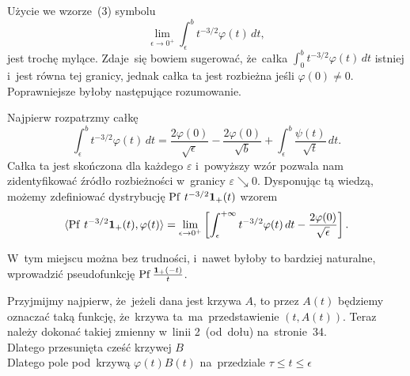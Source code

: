 \documentclass[a4paper,11pt]{article}
\begin{document}
\start {} Użycie we wzorze~(3) symbolu
\begin{equation}
  \label{eq:Zem-s01-01}
  \lim_{ \epsilon \to 0^{ + } } \int_{ \epsilon }^{ b } t^{ -3 / 2 } \varphi( t ) \, dt,
\end{equation}
jest trochę mylące. Zdaje~się bowiem sugerować, że~całka
$\int_{ 0 }^{ b } t^{ -3 / 2 } \varphi( t ) \, dt$ istniej i~jest równa tej
granicy, jednak całka ta jest rozbieżna jeśli $\varphi( 0 ) \neq 0$.
Poprawniejsze byłoby następujące rozumowanie.

Najpierw rozpatrzmy całkę
\begin{equation}
  \label{eq:Zem-s01-02}
  \int_{ \epsilon }^{ b } t^{ -3/2 } \varphi( t ) \, dt
  =
  \frac{ 2 \varphi( 0 ) }{ \sqrt{ \epsilon } } - \frac{ 2 \varphi( 0 ) }{ \sqrt{ b } }
  + \int_{ \epsilon }^{ b } \frac{ \psi( t ) }{ \sqrt{ t } } \, dt.
\end{equation}
Całka ta jest skończona dla każdego $\varepsilon$ i~powyższy wzór pozwala
nam zidentyfikować źródło rozbieżności w~granicy $\varepsilon \searrow 0$.
Dysponując tą wiedzą, możemy zdefiniować dystrybucję
$\mathrm{Pf}\, \, t^{ -3 / 2 } \mathbf{1}_{ + }( t )$ wzorem
\begin{equation}
  \label{eq:Zem-s01-03}
  \langle \mathrm{Pf}\, \, t^{ -3/2 } \mathbf{1}_{ + }( t ), \varphi( t ) \rangle
  =
  \lim_{ \epsilon \to 0^{ + } } \left[ \int_{ \epsilon }^{ +\infty } t^{ -3/2 } \varphi( t ) \, dt
    - \frac{ 2 \varphi( 0 ) }{ \sqrt{ \epsilon } } \right].
\end{equation}

\vspace{\spaceFour}



\start {} W~tym miejscu można bez trudności, i~nawet byłoby to
bardziej naturalne, wprowadzić pseudofunkcję
$\mathrm{Pf}\, \frac{ \mathbf{1}_{ + }( -t )}{ t }$.

\vspace{\spaceFour}



\start {} Przyjmijmy najpierw, że~jeżeli dana jest krzywa
$A$, to przez $A( t )$ będziemy oznaczać taką funkcję, że~krzywa
ta~ma~przedstawienie $( t, A( t ) )$. Teraz należy dokonać takiej
zmienny w~linii 2~(od~dołu) na~stronie~34. \\
\Jest  Dlatego przesunięta cześć krzywej $B$ \\
\Powin Dlatego pole pod~krzywą $\varphi( t ) B( t )$ na~przedziale
$\tau \leq t \leq \epsilon$

\vspace{\spaceFour}
\end{document}
